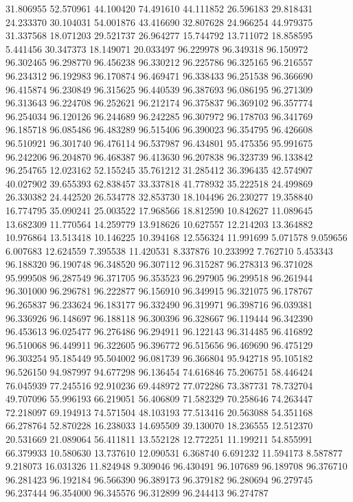 31.806955
52.570961
44.100420
74.491610
44.111852
26.596183
29.818431
24.233370
30.104031
54.001876
43.416690
32.807628
24.966254
44.979375
31.337568
18.071203
29.521737
26.964277
15.744792
13.711072
18.858595
5.441456
30.347373
18.149071
20.033497
96.229978
96.349318
96.150972
96.302465
96.298770
96.456238
96.330212
96.225786
96.325165
96.216557
96.234312
96.192983
96.170874
96.469471
96.338433
96.251538
96.366690
96.415874
96.230849
96.315625
96.440539
96.387693
96.086195
96.271309
96.313643
96.224708
96.252621
96.212174
96.375837
96.369102
96.357774
96.254034
96.120126
96.244689
96.242285
96.307972
96.178703
96.341769
96.185718
96.085486
96.483289
96.515406
96.390023
96.354795
96.426608
96.510921
96.301740
96.476114
96.537987
96.434801
95.475356
95.991675
96.242206
96.204870
96.468387
96.413630
96.207838
96.323739
96.133842
96.254765
12.023162
52.155245
35.761212
31.285412
36.396435
42.574907
40.027902
39.655393
62.838457
33.337818
41.778932
35.222518
24.499869
26.330382
24.442520
26.534778
32.853730
18.104496
26.230277
19.358840
16.774795
35.090241
25.003522
17.968566
18.812590
10.842627
11.089645
13.682309
11.770564
14.259779
13.918626
10.627557
12.214203
13.364882
10.976864
13.513418
10.146225
10.394168
12.556324
11.991699
5.071578
9.059656
6.007683
12.624559
7.395538
11.420531
8.337876
10.233992
7.762710
5.453343
96.188320
96.190748
96.348520
96.307112
96.315287
96.278313
96.371028
95.999508
96.287549
96.371705
96.353523
96.297905
96.299518
96.261944
96.301000
96.296781
96.222877
96.156910
96.349915
96.321075
96.178767
96.265837
96.233624
96.183177
96.332490
96.319971
96.398716
96.039381
96.336926
96.148697
96.188118
96.300396
96.328667
96.119444
96.342390
96.453613
96.025477
96.276486
96.294911
96.122143
96.314485
96.416892
96.510068
96.449911
96.322605
96.396772
96.515656
96.469690
96.475129
96.303254
95.185449
95.504002
96.081739
96.366804
95.942718
95.105182
96.526150
94.987997
94.677298
96.136454
74.616846
75.206751
58.446424
76.045939
77.245516
92.910236
69.448972
77.072286
73.387731
78.732704
49.707096
55.996193
66.219051
56.406809
71.582329
70.258646
74.263447
72.218097
69.194913
74.571504
48.103193
77.513416
20.563088
54.351168
66.278764
52.870228
16.238033
14.695509
39.130070
18.236555
12.512370
20.531669
21.089064
56.411811
13.552128
12.772251
11.199211
54.855991
66.379933
10.580630
13.737610
12.090531
6.368740
6.691232
11.594173
8.587877
9.218073
16.031326
11.824948
9.309046
96.430491
96.107689
96.189708
96.376710
96.281423
96.192184
96.566390
96.389173
96.379182
96.280694
96.279745
96.237444
96.354000
96.345576
96.312899
96.244413
96.274787
